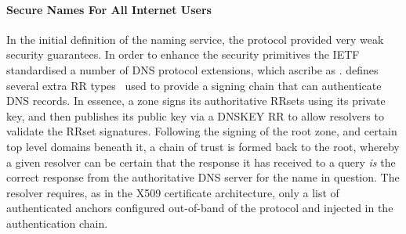 % 
% 

\paragraph{Secure Names For All Internet Users}

In the initial definition of the naming service, the protocol provided very weak
security guarantees. In order to enhance the security primitives the IETF
standardised a number of DNS protocol extensions, which ascribe as \dnssec.
\dnssec defines several extra RR types~\cite{RFC4034} used to provide a signing
chain that can authenticate DNS records.  In essence, a zone signs its
authoritative RRsets using its private key, and then publishes its public key
via a DNSKEY RR to allow resolvers to validate the RRset signatures. Following
the signing of the root zone, and certain top level domains beneath it, a chain
of trust is formed back to the root, whereby a given resolver can be certain
that the response it has received to a query \emph{is} the correct response from
the authoritative DNS server for the name in question. The resolver requires, as
in the X509 certificate architecture, only a list of authenticated anchors
configured out-of-band of the protocol and injected in the authentication chain.

